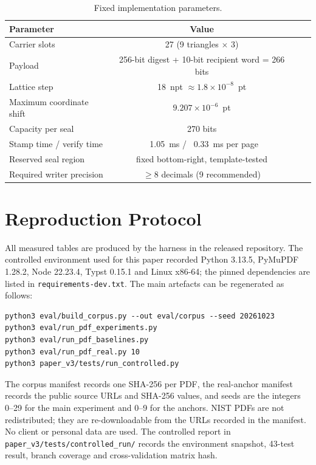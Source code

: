 \documentclass[journal]{IEEEtran}
\begin{document}
\begin{table}[t]
\centering
\footnotesize
\caption{Fixed implementation parameters.}
\label{tab:params}
\begin{tabular}{@{}lccc@{}}
\toprule
Parameter & Value \\
\midrule
Carrier slots & 27 (9 triangles $\times$ 3) \\
Payload & 256-bit digest + 10-bit recipient word = 266 bits \\
Lattice step & 18~npt $\approx 1.8\times10^{-8}$~pt \\
Maximum coordinate shift & $9.207\times10^{-6}$~pt \\
Capacity per seal & 270 bits \\
Stamp time / verify time & ~1.05~ms / ~0.33~ms per page \\
Reserved seal region & fixed bottom-right, template-tested \\
Required writer precision & $\ge 8$ decimals (9 recommended) \\
\bottomrule
\end{tabular}
\end{table}

\section{Reproduction Protocol}
All measured tables are produced by the harness in the released repository. The controlled environment used for this paper recorded Python 3.13.5, PyMuPDF 1.28.2, Node 22.23.4, Typst 0.15.1 and Linux x86-64; the pinned dependencies are listed in \texttt{requirements-dev.txt}. The main artefacts can be regenerated as follows:
\begin{verbatim}
python3 eval/build_corpus.py --out eval/corpus --seed 20261023
python3 eval/run_pdf_experiments.py
python3 eval/run_pdf_baselines.py
python3 eval/run_pdf_real.py 10
python3 paper_v3/tests/run_controlled.py
\end{verbatim}
The corpus manifest records one SHA-256 per PDF, the real-anchor manifest records the public source URLs and SHA-256 values, and seeds are the integers 0--29 for the main experiment and 0--9 for the anchors. NIST PDFs are not redistributed; they are re-downloadable from the URLs recorded in the manifest. No client or personal data are used. The controlled report in \texttt{paper\_v3/tests/controlled\_run/} records the environment snapshot, 43-test result, branch coverage and cross-validation matrix hash.
\end{document}
